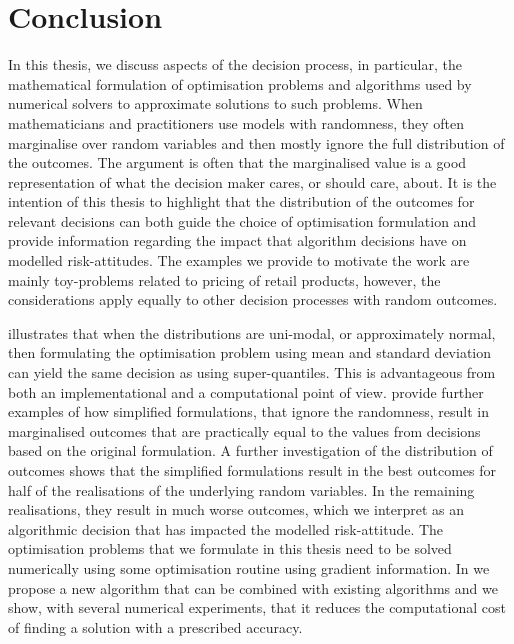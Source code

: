 \documentclass[main.tex]{subfiles}
\begin{document}
\chapter{Conclusion}\label{ch:conclusion}

In this thesis, we discuss aspects of the decision process, in
particular, the mathematical formulation of optimisation problems and
algorithms used by numerical solvers to approximate solutions to such
problems.  When mathematicians and practitioners use models with
randomness, they often marginalise over random variables and then
mostly ignore the full distribution of the outcomes. The argument is
often that the marginalised value is a good representation of what the
decision maker cares, or should care, about.  It is the intention of
this thesis to highlight that the distribution of the outcomes for
relevant decisions can both guide the choice of optimisation
formulation and provide information regarding the impact that algorithm
decisions have on modelled risk-attitudes.  The examples we provide to
motivate the work are mainly toy-problems related to pricing of retail
products, however, the considerations apply equally to other decision
processes with random outcomes.

 illustrates that when the distributions are
uni-modal, or approximately normal, then formulating the optimisation
problem using mean and standard deviation can yield the same decision
as using super-quantiles. This is advantageous from both an
implementational and a computational point of view.
 provide further examples of
how simplified formulations, that ignore the randomness, result in
marginalised outcomes that are practically equal to the values from
decisions based on the original formulation. A further investigation
of the distribution of outcomes shows that the simplified formulations
result in the best outcomes for half of the realisations of the
underlying random variables. In the remaining realisations, they
result in much worse outcomes, which we interpret as an algorithmic
decision that has impacted the modelled risk-attitude.  The
optimisation problems that we formulate in this thesis need to be
solved numerically using some optimisation routine using gradient
information. In  we propose a new algorithm that can
be combined with existing algorithms and we show, with several
numerical experiments, that it reduces the computational cost of
finding a solution with a prescribed accuracy.
\end{document}
